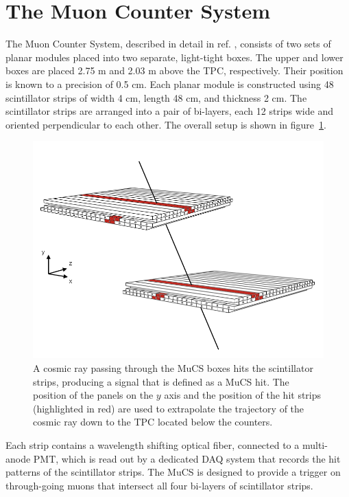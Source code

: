 \documentclass[a4paper,11pt]{article}
\begin{document}
\section{The Muon Counter System}\label{sec:proc}
The Muon Counter System, described in detail in ref. \cite{mucs}, consists of two sets of planar modules placed into two separate, light-tight boxes. The upper and lower boxes are placed 2.75 m and 2.03 m above the TPC, respectively. Their position is known to a precision of 0.5 cm. Each planar module is constructed using 48 scintillator strips of width 4 cm, length 48 cm, and thickness 2 cm. The scintillator strips are arranged into a pair of bi-layers, each 12 strips wide and oriented perpendicular to each other. The overall setup is shown in figure~\ref{fig:boxes}.

\begin{figure}[htbp]
  \begin{center}
    \includegraphics[width=0.7\linewidth]{figures/boxes.png}
    \caption{A cosmic ray passing through the MuCS boxes hits the scintillator strips, producing a signal that is defined as a MuCS hit. The position of the panels on the $y$ axis and the position of the hit strips (highlighted in red) are used to extrapolate the trajectory of the cosmic ray down to the TPC located below the counters.} \label{fig:boxes}
  \end{center}
\end{figure}

Each strip contains a wavelength shifting optical fiber, connected to a multi-anode PMT, which is read out by a dedicated DAQ system that records the hit patterns of the scintillator strips.
The MuCS is designed to provide a trigger on through-going muons that intersect all four bi-layers of scintillator strips.
\end{document}
